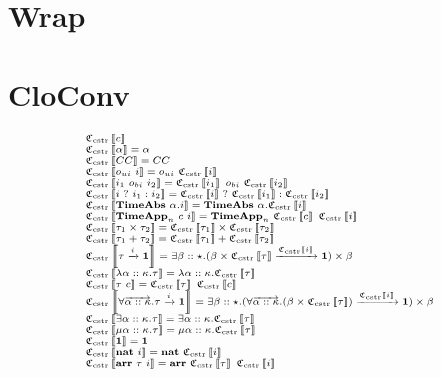 \documentclass[fleqn]{article}
\begin{document}
\section{Wrap}

\section{CloConv}

\newcommand{\cloc}[1]{\mathfrak{C}_{\mathrm{cstr}}\left\llbracket #1 \right\rrbracket}

\[
\scriptsize
\begin{array}{l}
	\cloc{c} \\
	\cloc{\alpha} = \alpha \\
	\cloc{CC} = CC \\
	\cloc{o_{ui}~i} = o_{ui}~\cloc{i} \\
	\cloc{i_1~o_{bi}~i_2} = \cloc{i_1}~o_{bi}~\cloc{i_2} \\
	\cloc{i~?~i_1 : i_2} = \cloc{i}~?~\cloc{i_1} : \cloc{i_2} \\
	\cloc{\mathbf{TimeAbs}~\alpha.i} = \mathbf{TimeAbs}~\alpha.\cloc{i} \\
	\cloc{\mathbf{TimeApp}_n~c~i} = \mathbf{TimeApp}_n~\cloc{c}~\cloc{i} \\
	\cloc{\tau_1 \times \tau_2} = \cloc{\tau_1} \times \cloc{\tau_2} \\
	\cloc{\tau_1 + \tau_2} = \cloc{\tau_1} + \cloc{\tau_2} \\
	\cloc{\tau \xrightarrow{i} \mathbf{1}} = \exists \beta :: \star. (\beta \times \cloc{\tau} \xrightarrow{\cloc{i}} \mathbf{1}) \times \beta \\
	\cloc{\lambda \alpha :: \kappa. \tau} = \lambda \alpha :: \kappa. \cloc{\tau} \\
	\cloc{\tau~c} = \cloc{\tau}~\cloc{c} \\
	\cloc{\forall \overrightarrow{\alpha :: \kappa}. \tau \xrightarrow{i} \mathbf{1}} = \exists \beta :: \star. (\forall \overrightarrow{\alpha :: \kappa}. (\beta \times \cloc{\tau}) \xrightarrow{\cloc{i}} \mathbf{1}) \times \beta \\
	\cloc{\exists \alpha :: \kappa. \tau} = \exists \alpha :: \kappa. \cloc{\tau} \\
	\cloc{\mu \alpha :: \kappa. \tau} = \mu \alpha :: \kappa. \cloc{\tau} \\
	\cloc{\mathbf{1}} = \mathbf{1} \\
	\cloc{\mathbf{nat}~i} = \mathbf{nat}~\cloc{i} \\
	\cloc{\mathbf{arr}~\tau~i} = \mathbf{arr}~\cloc{\tau}~\cloc{i}
\end{array}
\]
\end{document}
